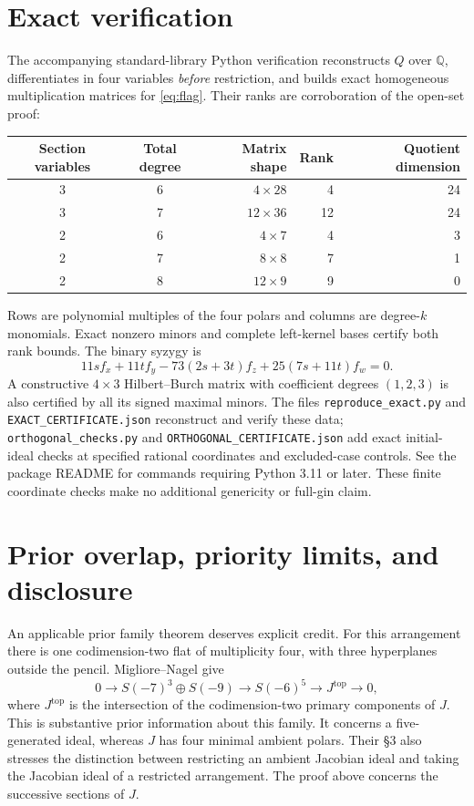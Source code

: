 \documentclass[11pt]{article}
\begin{document}
\section{Exact verification}
The accompanying standard-library Python verification reconstructs $Q$ over
$\mathbb Q$, differentiates in four variables \emph{before} restriction,
and builds exact homogeneous multiplication matrices for \eqref{eq:flag}.
Their ranks are corroboration of the open-set proof:
\begin{center}
\begin{tabular}{ccrrr}
\toprule
Section variables & Total degree & Matrix shape & Rank & Quotient dimension\\
\midrule
3&6&$4\times28$&4&24\\
3&7&$12\times36$&12&24\\
2&6&$4\times7$&4&3\\
2&7&$8\times8$&7&1\\
2&8&$12\times9$&9&0\\
\bottomrule
\end{tabular}
\end{center}
Rows are polynomial multiples of the four polars and columns are degree-$k$
monomials. Exact nonzero minors and complete left-kernel bases certify both
rank bounds. The binary syzygy is
\[
 11s f_x+11t f_y-73(2s+3t)f_z+25(7s+11t)f_w=0.
\]
A constructive $4\times3$ Hilbert--Burch matrix with coefficient degrees
$(1,2,3)$ is also certified by all its signed maximal minors.
The files \texttt{reproduce\_exact.py} and \texttt{EXACT\_CERTIFICATE.json}
reconstruct and verify these data; \texttt{orthogonal\_checks.py} and
\texttt{ORTHOGONAL\_CERTIFICATE.json} add exact initial-ideal checks at
specified rational coordinates and excluded-case controls. See the package
README for commands requiring Python 3.11 or later. These finite coordinate
checks make no additional genericity or full-gin claim.

\section{Prior overlap, priority limits, and disclosure}
An applicable prior family theorem deserves explicit credit. For this
arrangement there is one codimension-two flat of multiplicity four, with
three hyperplanes outside the pencil. Migliore--Nagel
\cite[\S8.2, Theorem 8.11 and Corollary 8.12]{MN} give
\[
 0\longrightarrow S(-7)^3\oplus S(-9)
 \longrightarrow S(-6)^5\longrightarrow J^{\mathrm{top}}
 \longrightarrow0,
\]
where $J^{\mathrm{top}}$ is the intersection of the codimension-two primary
components of $J$. This is substantive prior information about this family.
It concerns a five-generated ideal, whereas $J$ has four minimal ambient
polars. Their \S3 also stresses the distinction between restricting an
ambient Jacobian ideal and taking the Jacobian ideal of a restricted
arrangement. The proof above concerns the successive sections of $J$.
\end{document}
